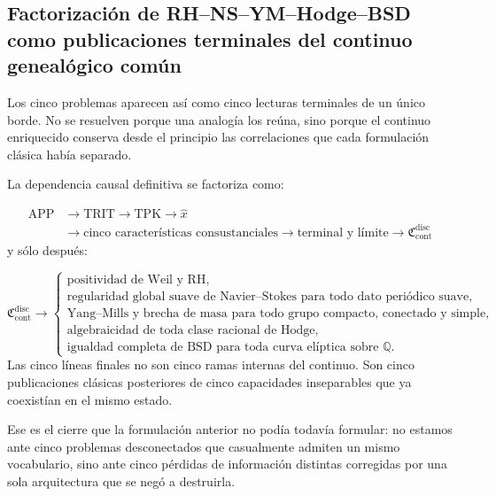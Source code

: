 \subsection{Factorización de RH–NS–YM–Hodge–BSD como publicaciones terminales del continuo genealógico común}
Los cinco problemas aparecen así como cinco lecturas terminales de un único borde. No se resuelven porque una analogía los reúna, sino porque el continuo enriquecido conserva desde el principio las correlaciones que cada formulación clásica había separado.\par
La dependencia causal definitiva se factoriza como:\par
\[
\begin{aligned}
\mathrm{APP}
&\longrightarrow \mathrm{TRIT}
\longrightarrow \mathrm{TPK}
\longrightarrow \widehat x\\
&\longrightarrow \text{cinco características consustanciales}
\longrightarrow \text{terminal y límite}
\longrightarrow \mathfrak C_{\mathrm{cont}}^{\mathrm{disc}}
\end{aligned}
\]
y sólo después:\par
\[
\mathfrak C_{\mathrm{cont}}^{\mathrm{disc}}
\longrightarrow
\begin{cases}
\text{positividad de Weil y RH},\\
\text{regularidad global suave de Navier--Stokes para todo dato periódico suave},\\
\text{Yang--Mills y brecha de masa para todo grupo compacto, conectado y simple},\\
\text{algebraicidad de toda clase racional de Hodge},\\
\text{igualdad completa de BSD para toda curva elíptica sobre }\mathbb Q.
\end{cases}
\]
Las cinco líneas finales no son cinco ramas internas del continuo. Son cinco publicaciones clásicas posteriores de cinco capacidades inseparables que ya coexistían en el mismo estado.\par
Ese es el cierre que la formulación anterior no podía todavía formular: no estamos ante cinco problemas desconectados que casualmente admiten un mismo vocabulario, sino ante cinco pérdidas de información distintas corregidas por una sola arquitectura que se negó a destruirla.\par
